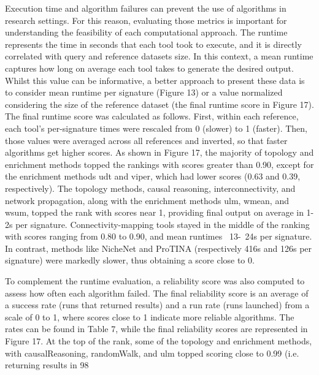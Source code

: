Execution time and algorithm failures can prevent the use of algorithms in research settings. For this reason, evaluating those metrics is important for understanding the feasibility of each computational approach. The runtime represents the time in seconds that each tool took to execute, and it is directly correlated with query and reference datasets size. In this context, a mean runtime captures how long on average each tool takes to generate the desired output. Whilst this value can be informative, a better approach to present these data is to consider mean runtime per signature (Figure 13) or a value normalized considering the size of the reference dataset (the final runtime score in Figure 17). The final runtime score was calculated as follows. First, within each reference, each tool's per-signature times were rescaled from 0 (slower) to 1 (faster). Then, those values were averaged across all references and inverted, so that faster algorithms get higher scores. As shown in Figure 17, the majority of topology and enrichment methods topped the rankings with scores greater than 0.90, except for the enrichment methods udt and viper, which had lower scores (0.63 and 0.39, respectively). The topology methods, causal reasoning, interconnectivity, and network propagation, along with the enrichment methods ulm, wmean, and wsum, topped the rank with scores near 1, providing final output on average in 1-2s per signature. Connectivity-mapping tools stayed in the middle of the ranking with scores ranging from 0.80 to 0.90, and mean runtimes ~13-~24s per signature. In contrast, methods like NicheNet and ProTINA (respectively 416s and 126s per signature) were markedly slower, thus obtaining a score close to 0. 

To complement the runtime evaluation, a reliability score was also computed to assess how often each algorithm failed. The final reliability score is an average of a success rate (runs that returned results) and a run rate (runs launched) from a scale of 0 to 1, where scores close to 1 indicate more reliable algorithms. The rates can be found in Table 7, while the final reliability scores are represented in Figure 17. At the top of the rank, some of the topology and enrichment methods, with  causalReasoning, randomWalk, and ulm topped scoring close to 0.99 (i.e. returning results in 98%




